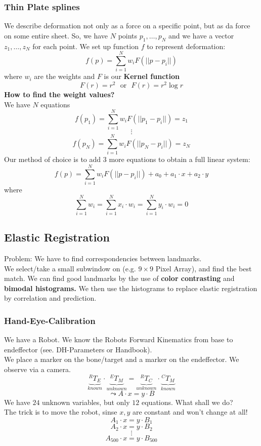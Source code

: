 \documentclass{exerciseBlue}
\begin{document}
\subsubsection{Thin Plate splines}
We describe deformation not only as a force on a specific point, but as da force on some entire sheet. So, we have $N$ points $p_1, \dots , p_N$ and we have a vector $z_1,\dots, z_N$ for each point. We set up function $f$ to represent deformation:
$$f(p) = \sum_{i=1}^{N} w_iF(||p-p_i||)$$
where $w_i$ are the weights and $F$ is our \textbf{Kernel function} 
$$F(r) = r^2 \ \ \ \text{or} \ \ \ F(r)=r^2\log r$$
\newpage\textbf{How to find the weight values?}\\
We have $N$ equations
$$f(p_1) = \sum_{i=1}^{N} w_iF(||p_1-p_i||) = z_1$$
$$\vdots$$
$$f(p_N) = \sum_{i=1}^{N} w_iF(||p_N-p_i||) = z_N$$
Our method of choice is to add 3 more equations to obtain a full linear system:
$$f(p) = \sum_{i=1}^{N} w_iF(||p-p_i||) + a_0 + a_1\cdot x + a_2\cdot y$$
where
$$\sum_{i=1}^{N}w_i = \sum_{i=1}^{N}x_i\cdot w_i = \sum_{i=1}^{N}y_i\cdot w_i = 0$$
\subsection{Elastic Registration}
Problem: We have to find correspondencies between landmarks.\\
We select/take a small subwindow on (e.g. $9\times9$ Pixel Array), and find the best match. We can find good landmarks by the use of \textbf{color contrasting} and \textbf{bimodal histograms.} We then use the histograms to replace elastic registration by correlation and prediction.
\subsubsection{Hand-Eye-Calibration}
We have a Robot. We know the Robots Forward Kinematics from base to endeffector (see. DH-Parameters or Handbook).\\
We place a marker on the bone/target and a marker on the endeffector. We observe via a camera.
$$\underbrace{^RT_E}_{known}\cdot \underbrace{^ET_M}_{unknown} = \underbrace{^RT_C}_{unknown} \cdot \underbrace{^CT_M}_{known}$$
$$\leadsto A\cdot x = y \cdot B$$
We have $24$ unknown variables, but only $12$ equations. What shall we do?\\
The trick is to move the robot, sinse $x,y$ are constant and won't change at all!
$$A_1 \cdot x=y \cdot B_1$$
$$A_2 \cdot x=y \cdot B_2$$
$$\vdots$$
$$A_{500} \cdot x=y \cdot B_{500}$$
\end{document}
